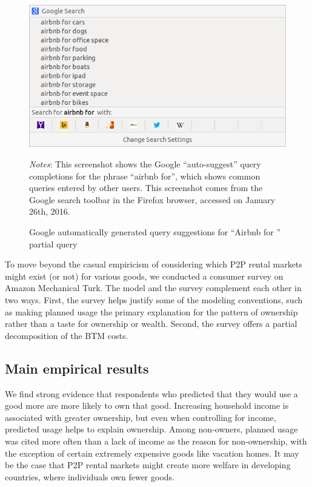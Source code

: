 \documentclass[11pt]{article}
\begin{document}
\begin{figure}
\centering 
\caption{Google automatically generated query suggestions for ``Airbnb for '' partial query}
\label{fig:auto} 
\begin{minipage}{0.70 \linewidth}
  \includegraphics[width = \linewidth]{./images/airbnb_for_x.png} \\
  \begin{footnotesize}
  \emph{Notes}: This screenshot shows the Google ``auto-suggest'' query completions for the phrase ``airbnb for'', which shows common queries entered by other users.
  This screenshot comes from the Google search toolbar in the Firefox browser, accessed on January 26th, 2016.
  \end{footnotesize}
\end{minipage}
\end{figure} 

To move beyond the casual empiricism of considering which P2P rental markets might exist (or not) for various goods, we conducted a consumer survey on Amazon Mechanical Turk. 
The model and the survey complement each other in two ways. 
First, the survey helps justify some of the modeling conventions, such as making planned usage the primary explanation for the pattern of ownership rather than a taste for ownership or wealth. 
Second, the survey offers a partial decomposition of the BTM costs. 

\subsection{Main empirical results}
We find strong evidence that respondents who predicted that they would use a good more are more likely to own that good.
Increasing household income is associated with greater ownership, but even when controlling for income, predicted usage helps to explain ownership. 
Among non-owners, planned usage was cited more often than a lack of income as the reason for non-ownership, with the exception of certain extremely expensive goods like vacation homes.
It may be the case that P2P rental markets might create more welfare in developing countries, where individuals own fewer goods. 
\end{document}
